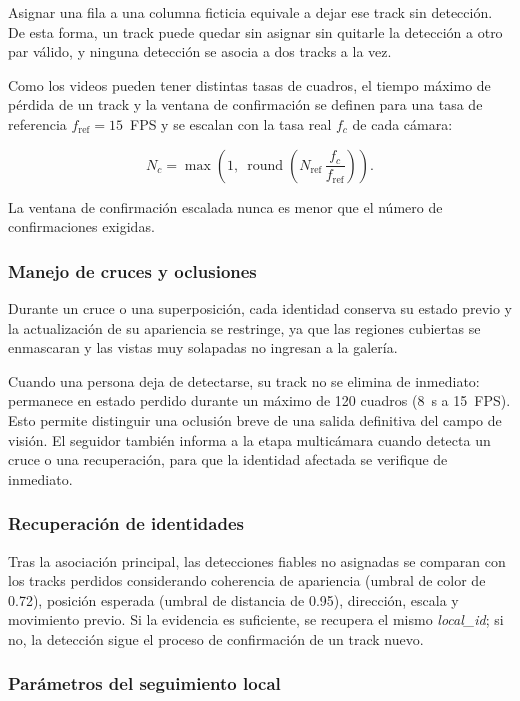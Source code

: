 \documentclass[12pt,a4paper]{article}
\begin{document}
Asignar una fila a una columna ficticia equivale a dejar ese track sin
detección. De esta forma, un track puede quedar sin asignar sin quitarle
la detección a otro par válido, y ninguna detección se asocia a dos
tracks a la vez.

Como los videos pueden tener distintas tasas de cuadros, el tiempo máximo
de pérdida de un track y la ventana de confirmación se definen para una
tasa de referencia $f_{\text{ref}}=15$~FPS y se escalan con la tasa real
$f_c$ de cada cámara:

\begin{equation}
N_c = \max\!\left(1,\ \operatorname{round}\!\left(N_{\text{ref}}\,\frac{f_c}{f_{\text{ref}}}\right)\right).
\end{equation}

La ventana de confirmación escalada nunca es menor que el número de
confirmaciones exigidas.

\subsubsection{Manejo de cruces y oclusiones}

Durante un cruce o una superposición, cada identidad conserva su estado
previo y la actualización de su apariencia se restringe, ya que las
regiones cubiertas se enmascaran y las vistas muy solapadas no ingresan
a la galería.

Cuando una persona deja de detectarse, su track no se elimina de
inmediato: permanece en estado perdido durante un máximo de 120 cuadros
(8~s a 15~FPS). Esto permite distinguir una oclusión breve de una salida
definitiva del campo de visión. El seguidor también informa a la etapa
multicámara cuando detecta un cruce o una recuperación, para que la
identidad afectada se verifique de inmediato.

\subsubsection{Recuperación de identidades}

Tras la asociación principal, las detecciones fiables no asignadas se
comparan con los tracks perdidos considerando coherencia de apariencia
(umbral de color de 0.72), posición esperada (umbral de distancia de
0.95), dirección, escala y movimiento previo. Si la evidencia es
suficiente, se recupera el mismo \textit{local\_id}; si no, la detección
sigue el proceso de confirmación de un track nuevo.

\subsubsection{Parámetros del seguimiento local}
\end{document}

